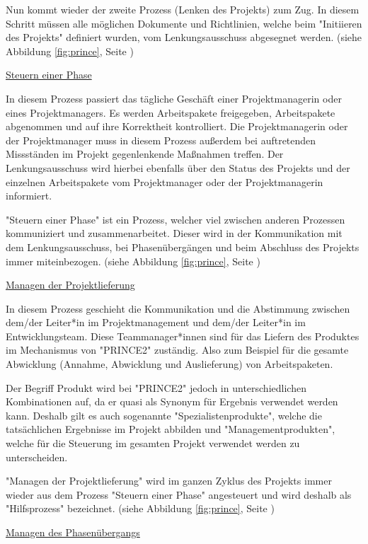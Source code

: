 Nun kommt wieder der zweite Prozess (Lenken des Projekts) zum Zug. In diesem Schritt müssen alle möglichen Dokumente und Richtlinien, welche beim "Initiieren des Projekts" definiert wurden, vom Lenkungsausschuss abgesegnet werden. (siehe Abbildung \ref{fig:prince}, Seite \pageref{fig:prince}) \cite{Prince2}

\underline{Steuern einer Phase}

In diesem Prozess passiert das tägliche Geschäft einer Projektmanagerin oder eines Projektmanagers. Es werden Arbeitspakete freigegeben, Arbeitspakete abgenommen und auf ihre Korrektheit kontrolliert. Die Projektmanagerin oder der Projektmanager muss in diesem Prozess außerdem bei auftretenden Missständen im Projekt gegenlenkende Maßnahmen treffen. Der Lenkungsausschuss wird hierbei ebenfalls über den Status des Projekts und der einzelnen Arbeitspakete vom Projektmanager oder der Projektmanagerin informiert. \cite{Prince2}

"Steuern einer Phase" ist ein Prozess, welcher viel zwischen anderen Prozessen kommuniziert und zusammenarbeitet. Dieser wird in der Kommunikation mit dem Lenkungsausschuss, bei Phasenübergängen und beim Abschluss des Projekts immer miteinbezogen. (siehe Abbildung \ref{fig:prince}, Seite \pageref{fig:prince}) \cite{Prince2}

\underline{Managen der Projektlieferung}

In diesem Prozess geschieht die Kommunikation und die Abstimmung zwischen dem/der Leiter*in im Projektmanagement und dem/der Leiter*in im Entwicklungsteam. Diese Teammanager*innen sind für das Liefern des Produktes im Mechanismus von "PRINCE2" zuständig. Also zum Beispiel für die gesamte Abwicklung (Annahme, Abwicklung und Auslieferung) von Arbeitspaketen. \cite{Prince2}

Der Begriff Produkt wird bei "PRINCE2" jedoch in unterschiedlichen Kombinationen auf, da er quasi als Synonym für Ergebnis verwendet werden kann. Deshalb gilt es auch sogenannte "Spezialistenprodukte", welche die tatsächlichen Ergebnisse im Projekt abbilden und "Managementprodukten", welche für die Steuerung im gesamten Projekt verwendet werden zu unterscheiden. \cite{Prince2}

"Managen der Projektlieferung" wird im ganzen Zyklus des Projekts immer wieder aus dem Prozess "Steuern einer Phase" angesteuert und wird deshalb als "Hilfsprozess" bezeichnet. (siehe Abbildung \ref{fig:prince}, Seite \pageref{fig:prince}) \cite{Prince2}

\underline{Managen des Phasenübergangs}

